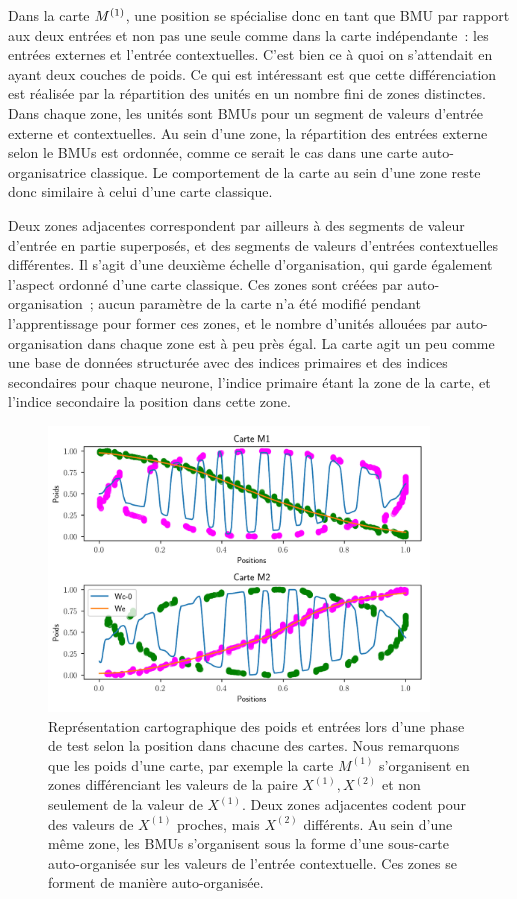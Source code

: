 \documentclass[../main]{subfiles}
\begin{document}
Dans la carte $M^{({1})}$, une position se spécialise donc en tant que BMU par rapport aux deux entrées et non pas une seule comme dans la carte indépendante~: les entrées externes et l'entrée contextuelles. C'est bien ce à quoi on s'attendait en ayant deux couches de poids. Ce qui est intéressant est que cette différenciation est réalisée par la répartition des unités en un nombre fini de zones distinctes. Dans chaque zone, les unités sont BMUs pour un segment de valeurs d'entrée externe et contextuelles. Au sein d'une zone, la répartition des entrées externe selon le BMUs est ordonnée, comme ce serait le cas dans une carte auto-organisatrice classique. Le comportement de la carte au sein d'une zone reste donc similaire à celui d'une carte classique.

Deux zones adjacentes correspondent par ailleurs à des segments de valeur d'entrée en partie superposés, et des segments de valeurs d'entrées contextuelles différentes. Il s'agit d'une deuxième échelle d'organisation, qui garde également l'aspect ordonné d'une carte classique. Ces zones sont créées par auto-organisation~; aucun paramètre de la carte n'a été modifié pendant l'apprentissage pour former ces zones, et le nombre d'unités allouées par auto-organisation dans chaque zone est à peu près égal. La carte agit un peu comme une base de données structurée avec des indices primaires et des indices secondaires pour chaque neurone, l'indice primaire étant la zone de la carte, et l'indice secondaire la position dans cette zone.

\begin{figure}
	\centering\includegraphics[width=0.9\textwidth]{2som_cercle_w.pdf}
	\caption{Représentation cartographique des poids et entrées lors d'une phase de test selon la position dans chacune des cartes. Nous remarquons que les poids d'une carte, par exemple la carte $M^{(1)}$ s'organisent en zones différenciant les valeurs de la paire $X^{(1)}, X^{(2)}$ et non seulement de la valeur de $X^{(1)}$. Deux zones adjacentes codent pour des valeurs de $X^{(1)}$ proches, mais $X^{(2)}$ différents. Au sein d'une même zone, les BMUs s'organisent sous la forme d'une sous-carte auto-organisée sur les valeurs de l'entrée contextuelle. Ces zones se forment de manière auto-organisée. \label{fig:w}}
\end{figure}
\end{document}
